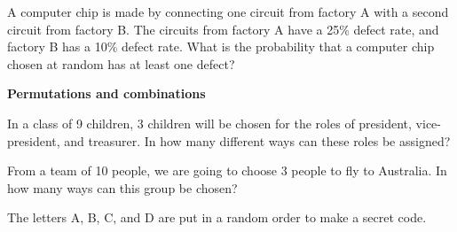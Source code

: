 \documentclass[12pt]{exam}
\begin{document}
\begin{questions}

\question
A computer chip is made by connecting one circuit from factory A with a second circuit from factory B.  The circuits from factory A have a 25\% defect rate, and factory B has a 10\% defect rate.  What is the probability that a computer chip chosen at random has at least one defect?

\end{questions}


\textbf{Permutations and combinations}
\begin{questions}
\setcounter{question}{7}
\question
In a class of 9 children, 3 children will be chosen for the roles of president, vice-president, and treasurer.  In how many different ways can these roles be assigned?

\question
From a team of 10 people, we are going to choose 3 people to fly to Australia.  In how many ways can this group be chosen?

\clearpage
\question
The letters A, B, C, and D are put in a random order to make a secret code.  

\end{questions}
\end{document}
